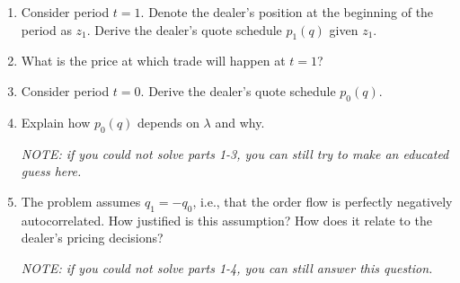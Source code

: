 \begin{enumerate}
	\item Consider period $t=1$. Denote the dealer's position at the beginning of the period as $z_1$. Derive the dealer's quote schedule $p_1(q)$ given $z_1$.
	
	\item What is the price at which trade will happen at $t=1$?
	
	\item Consider period $t=0$. Derive the dealer's quote schedule $p_0(q)$. 
	
	\item Explain how $p_0(q)$ depends on $\lambda$ and why.
	
	\emph{NOTE: if you could not solve parts 1-3, you can still try to make an educated guess here.}
	
	
	\item The problem assumes $q_1 = -q_0$, i.e., that the order flow is perfectly negatively autocorrelated. How justified is this assumption? How does it relate to the dealer's pricing decisions?
	
	\emph{NOTE: if you could not solve parts 1-4, you can still answer this question.}
\end{enumerate}


